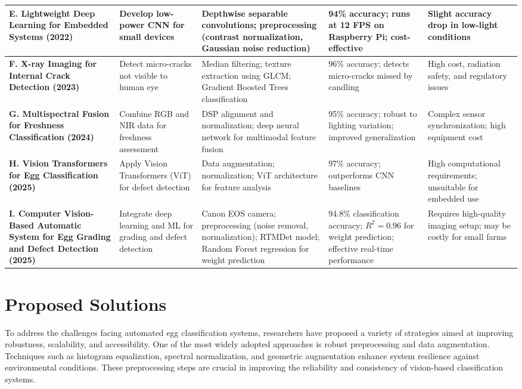 \documentclass[conference]{IEEEtran}
\begin{document}
\begin{table*}[htbp]
\begin{tabular}{|p{3cm}|p{3cm}|p{3cm}|p{3cm}|p{3cm}|}
			\hline
			\textbf{E. Lightweight Deep Learning for Embedded Systems (2022)} & Develop low-power CNN for small devices & Depthwise separable convolutions; preprocessing (contrast normalization, Gaussian noise reduction) & 94\% accuracy; runs at 12 FPS on Raspberry Pi; cost-effective & Slight accuracy drop in low-light conditions \\
			\hline
			\textbf{F. X-ray Imaging for Internal Crack Detection (2023)} & Detect micro-cracks not visible to human eye & Median filtering; texture extraction using GLCM; Gradient Boosted Trees classification & 96\% accuracy; detects micro-cracks missed by candling & High cost, radiation safety, and regulatory issues \\
			\hline
			\textbf{G. Multispectral Fusion for Freshness Classification (2024)} & Combine RGB and NIR data for freshness assessment & DSP alignment and normalization; deep neural network for multimodal feature fusion & 95\% accuracy; robust to lighting variation; improved generalization & Complex sensor synchronization; high equipment cost \\
			\hline
			\textbf{H. Vision Transformers for Egg Classification (2025)} & Apply Vision Transformers (ViT) for defect detection & Data augmentation; normalization; ViT architecture for feature analysis & 97\% accuracy; outperforms CNN baselines & High computational requirements; unsuitable for embedded use \\
			\hline
			\textbf{I. Computer Vision-Based Automatic System for Egg Grading and Defect Detection (2025)} & Integrate deep learning and ML for grading and defect detection & Canon EOS camera; preprocessing (noise removal, normalization); RTMDet model; Random Forest regression for weight prediction & 94.8\% classification accuracy; $R^2 = 0.96$ for weight prediction; effective real-time performance & Requires high-quality imaging setup; may be costly for small farms \\
			\hline
		\end{tabular}
	\end{table*}
	
	\section{Proposed Solutions}
	
	To address the challenges facing automated egg classification systems, researchers have proposed a variety of strategies aimed at improving robustness, scalability, and accessibility. One of the most widely adopted approaches is robust preprocessing and data augmentation. Techniques such as histogram equalization, spectral normalization, and geometric augmentation enhance system resilience against environmental conditions. These preprocessing steps are crucial in improving the reliability and consistency of vision-based classification systems.
	
\end{document}
